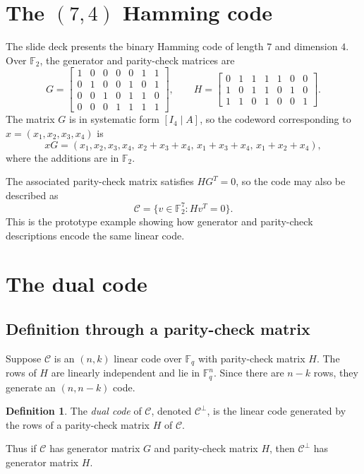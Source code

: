 \documentclass[11pt]{article}
\theoremstyle{definition}
\newtheorem{definition}[proposition]{Definition}
\theoremstyle{remark}
\newcommand{\F}{\mathbb{F}}
\newcommand{\code}{\mathcal{C}}
\newcommand{\dual}[1]{#1^{\perp}}
\begin{document}
\section{The $(7,4)$ Hamming code}

The slide deck presents the binary Hamming code of length $7$ and dimension $4$. Over $\F_2$, the generator and parity-check matrices are
\[
G=
\begin{bmatrix}
1&0&0&0&0&1&1\\
0&1&0&0&1&0&1\\
0&0&1&0&1&1&0\\
0&0&0&1&1&1&1
\end{bmatrix},
\qquad
H=
\begin{bmatrix}
0&1&1&1&1&0&0\\
1&0&1&1&0&1&0\\
1&1&0&1&0&0&1
\end{bmatrix}.
\]
The matrix $G$ is in systematic form $[I_4\mid A]$, so the codeword corresponding to $x=(x_1,x_2,x_3,x_4)$ is
\[
xG=(x_1,x_2,x_3,x_4,\,x_2+x_3+x_4,\,x_1+x_3+x_4,\,x_1+x_2+x_4),
\]
where the additions are in $\F_2$.

The associated parity-check matrix satisfies $HG^T=0$, so the code may also be described as
\[
\code=\{v\in\F_2^7:Hv^T=0\}.
\]
This is the prototype example showing how generator and parity-check descriptions encode the same linear code.

\section{The dual code}

\subsection{Definition through a parity-check matrix}

Suppose $\code$ is an $(n,k)$ linear code over $\F_q$ with parity-check matrix $H$. The rows of $H$ are linearly independent and lie in $\F_q^n$. Since there are $n-k$ rows, they generate an $(n,n-k)$ code.

\begin{definition}
The \emph{dual code} of $\code$, denoted $\dual{\code}$, is the linear code generated by the rows of a parity-check matrix $H$ of $\code$.
\end{definition}

Thus if $\code$ has generator matrix $G$ and parity-check matrix $H$, then $\dual{\code}$ has generator matrix $H$.
\end{document}
